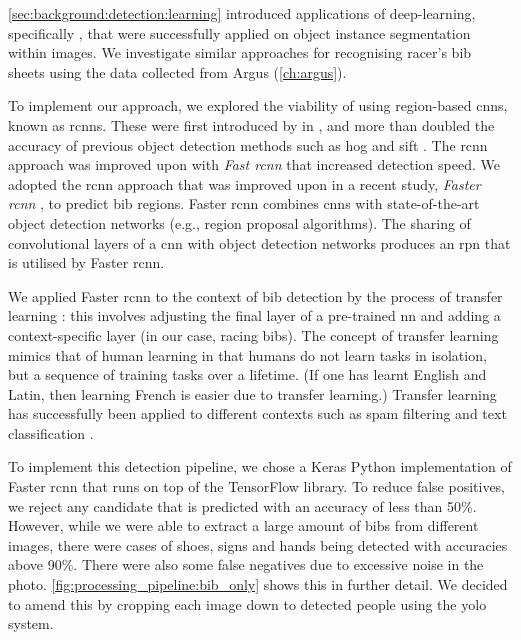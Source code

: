 \def \frcnn {Faster \gls{rcnn}}

\cref{sec:background:detection:learning} introduced applications of deep-learning, specifically , that were successfully applied on object instance segmentation within images. We investigate similar approaches for recognising racer's bib sheets using the data collected from Argus  (\cref{ch:argus}).

To implement our approach, we explored the viability of using region-based \glspl{cnn}, known as \glspl{rcnn}. These were first introduced by \citet{Girshick:2014jx} in \citeyear{Girshick:2014jx}, and more than doubled the accuracy of previous object detection methods such as \gls{hog} \citep{Dalal:2005jq} and \gls{sift} \citep{Lowe:2004kp}. The \gls{rcnn} approach was improved upon with \textit{Fast \gls{rcnn}} \citep{Girshick:2015vr} that increased detection speed. We adopted the \gls{rcnn} approach that was improved upon in a  recent \citeyear{Ren:2017ug} study, \textit{\frcnn{}} \citep{Ren:2017ug}, to predict bib regions. \frcnn{} combines \glspl{cnn} with state-of-the-art object detection networks (e.g., region proposal algorithms). The sharing of convolutional layers of a \gls{cnn} with object detection networks produces an \gls{rpn} that is utilised by \frcnn{}.

We applied \frcnn{} to the context of bib detection by the process of transfer learning \cite{Caruana:1997wk,Thrun:1996wh,Baxter:1997wr}: this involves adjusting the final layer of a pre-trained \gls{nn} and adding a context-specific layer (in our case, racing bibs). The concept of transfer learning mimics that of human learning in that humans do not learn tasks in isolation, but a sequence of training tasks over a lifetime. (If one has learnt English and Latin, then learning French is easier due to transfer learning.) Transfer learning has successfully been applied to different contexts such as spam filtering \citep{Bickel:2006ul} and text classification \citep{Raina:2006tv, Do:2005uz}.

To implement this detection pipeline, we chose a Keras \citep{chollet2015keras} Python implementation of \frcnn{} that runs on top of the TensorFlow \citep{tensorflow2015-whitepaper} library. To reduce false positives, we reject any candidate that is predicted with an accuracy of less than 50\%. However, while we were able to extract a large amount of bibs from different images, there were cases of shoes, signs and hands being detected with accuracies above 90\%. There were also some false negatives due to excessive noise in the photo. \cref{fig:processing_pipeline:bib_only} shows this in further detail. We decided to amend this by cropping each image down to detected people using the \gls{yolo} system.

